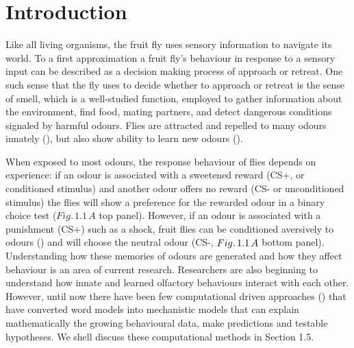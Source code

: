 
\chapter{Introduction}

\setcounter{chapter}{1}

Like all living organisms, the fruit fly uses sensory information
to navigate its world. To a first approximation a fruit fly's behaviour
in response to a sensory input can be described as a decision making
process of approach or retreat. One such sense that the fly uses to
decide whether to approach or retreat is the sense of smell, which
is a well-studied function, employed to gather information about the
environment, find food, mating partners, and detect dangerous conditions
signaled by harmful odours. Flies are attracted and repelled to many
odours innately (\citealp{Niewalda:2008bm}), but also show ability
to learn new odours (\citealp{Waddell:2010iw}). 

When exposed to most odours, the response behaviour of flies depends
on experience: if an odour is associated with a sweetened reward (CS+,
or conditioned stimulus) and another odour offers no reward (CS- or
unconditioned stimulus) the flies will show a preference for the rewarded
odour in a binary choice test ($Fig.\,1.1\,A$ top panel). However,
if an odour is associated with a punishment (CS+) such as a shock,
fruit flies can be conditioned aversively to odours (\citealp{Perisse:2013fpa})
and will choose the neutral odour (CS-, $Fig.\thinspace1.1\,A$ bottom
panel). Understanding how these memories of odours are generated and
how they affect behaviour is an area of current research. Researchers
are also beginning to understand how innate and learned olfactory
behaviours interact with each other. However, until now there have
been few computational driven approaches (\citealp{Luo:2010fb,Wessnitzer:2011dj})
that have converted word models into mechanistic models that can explain
mathematically the growing behavioural data, make predictions and
testable hypotheses. We shell discuss these computational methods
in Section 1.5.

